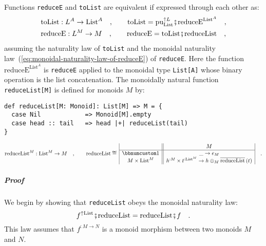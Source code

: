 Functions \lstinline!reduceE! and \lstinline!toList! are equivalent
if expressed through each other as:
\begin{align}
 & \text{toList}:L^{A}\rightarrow\text{List}^{A}\quad,\quad\quad\text{toList}=\text{pu}_{\text{List}}^{\uparrow L}\bef\text{reduceE}^{\text{List}^{A}}\quad,\label{eq:toList-via-reduceE}\\
 & \text{reduceE}:L^{M}\rightarrow M\quad,\quad\quad\text{reduceE}=\text{toList}\bef\text{reduceList}\quad,\label{eq:reduceE-via-toList}
\end{align}
assuming the naturality law of \lstinline!toList! and the monoidal
naturality law~(\ref{eq:monoidal-naturality-law-of-reduceE}) of
\lstinline!reduceE!. Here the function $\text{reduceE}^{\text{List}^{A}}$
is \lstinline!reduceE! applied to the monoidal type \lstinline!List[A]!
whose binary operation is the list concatenation. The monoidally natural
function \lstinline!reduceList[M]! is defined for monoids $M$ by:
\begin{lstlisting}
def reduceList[M: Monoid]: List[M] => M = {
  case Nil            => Monoid[M].empty
  case head :: tail   => head |+| reduceList(tail)
}
\end{lstlisting}
\[
\text{reduceList}^{M}:\text{List}^{M}\rightarrow M\quad,\quad\quad\text{reduceList}\triangleq\,\begin{array}{|c||c|}
 & M\\
\hline \bbnum 1 & \_\rightarrow e_{M}\\
M\times\text{List}^{M} & h^{:M}\times t^{:\text{List}^{M}}\rightarrow h\oplus_{M}\overline{\text{reduceList}}\left(t\right)
\end{array}\quad.
\]


\subparagraph{Proof}

We begin by showing that \lstinline!reduceList! obeys the monoidal
naturality law:
\[
f^{\uparrow\text{List}}\bef\text{reduceList}=\text{reduceList}\bef f\quad.
\]
This law assumes that $f^{:M\rightarrow N}$ is a monoid morphism
between two monoids $M$ and $N$. 

